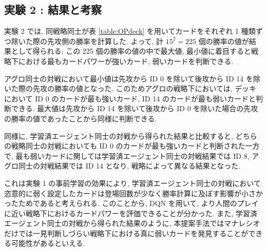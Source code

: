\documentclass[twocolumn]{jarticle}
\begin{document}
         \subsection{実験 2 : 結果と考察}
         実験 2 では, 同戦略同士が表 \ref{table:OPdeck} を用いてカードをそれぞれ 1 種類ずつ除いた際の先攻側の勝率を計算した. よって, 計 $15^2 = 225$ 個の勝率の値が結果として得られる. この 225 個の勝率の値の中で最大値, 最小値に着目すると戦略下における最もカードパワーが強いカード, 弱いカードを判断できる.
         \par
         アグロ同士の対戦において最小値は先攻から ID 0 を除いて後攻から ID 14 を除いた際の先攻の勝率の値となった. このためアグロの戦略下においては, デッキにおいて ID 0 のカードが最も強いカード, ID 14 のカードが最も弱いカードと判断できる. 最大値は先攻から ID 14 を除いて後攻から ID 0 を除いた場合の先攻の勝率の値であったことから同様に判断できる.
         \par
         同様に,  学習済エージェント同士の対戦から得られた結果と比較すると, どちらの戦略同士の対戦においても ID 0 のカードが最も強いカードと判断された一方で, 最も弱いカードに関しては学習済エージェント同士の対戦結果では ID 8, アグロ同士の対戦結果では ID 14 となり, 戦略によって異なる結果となった.\par
         これは実験 1 の事前学習の効果により, 学習済エージェント同士の対戦において恣意的に弱く設定したカードは登場回数が少なく勝率計算に及ぼす影響が小さかったためであると考えられる. 
         このことから, DQN を用いて, より人間のプレイに近い戦略下におけるカードパワーを評価できることが分かった. また, 学習済エージェント同士の対戦から得られた結果のように, 本提案手法ではマナレシオだけでは一見判断しづらい戦略下における真に弱いカードを発見することができる可能性があるといえる.
      
\end{document}
